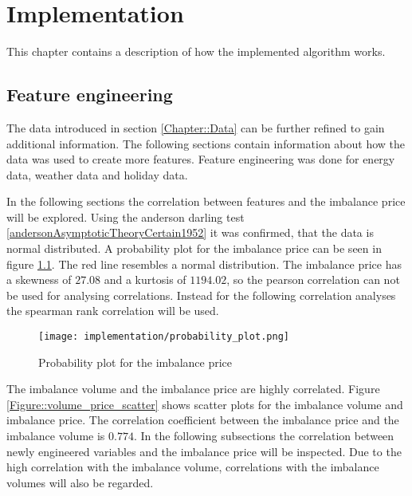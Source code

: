 \documentclass[class=scrbook, crop=false]{standalone}
\begin{document}
\chapter{Implementation} %
\label{Chapter::Implementation}
    This chapter contains a description of how the implemented algorithm works.

\section{Feature engineering}
\label{Section::Feature_engineering}

The data introduced in section \ref{Chapter::Data} can be further refined to gain additional information. 
The following sections contain information about how the data was used to create more features.
Feature engineering was done for energy data, weather data and holiday data.

In the following sections the correlation between features and the imbalance price will be explored.
Using the anderson darling test \ref{andersonAsymptoticTheoryCertain1952} it was confirmed, that the data is normal distributed.
A probability plot for the imbalance price can be seen in figure \ref{fig::rebap_distribution}. 
The red line resembles a normal distribution. 
The imbalance price has a skewness of $27.08$ and a kurtosis of $1194.02$, so the pearson correlation can not be used for analysing correlations.
Instead for the following correlation analyses the spearman rank correlation will be used.

\begin{figure}[ht]
            \centering
            \texttt{[image: implementation/probability\_plot.png]}
            \caption[Probability plot for the imbalance price]{Probability plot for the imbalance price}
            \label{fig::rebap_distribution}
 \end{figure}


The imbalance volume and the imbalance price are highly correlated. 
Figure \ref{Figure::volume_price_scatter} shows scatter plots for the imbalance volume and imbalance price.
The correlation coefficient between the imbalance price and the imbalance volume is $0.774$.
In the following subsections the correlation between newly engineered variables and the imbalance price will be inspected.
Due to the high correlation with the imbalance volume, correlations with the imbalance volumes will also be regarded.
\end{document}
